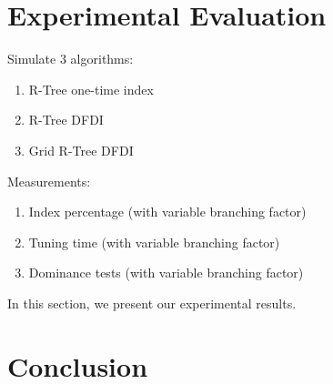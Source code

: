 \documentclass{sig-alternate}
\begin{document}
%
%
%
%

\section{Experimental Evaluation}

Simulate 3 algorithms:
\begin{enumerate}
\item R-Tree one-time index
\item R-Tree DFDI
\item Grid R-Tree DFDI
\end{enumerate}

Measurements:
\begin{enumerate}
\item Index percentage (with variable branching factor)
\item Tuning time (with variable branching factor)
\item Dominance tests (with variable branching factor)
\end{enumerate}

In this section, we present our experimental results.

\section{Conclusion}
%
%
\end{document}
